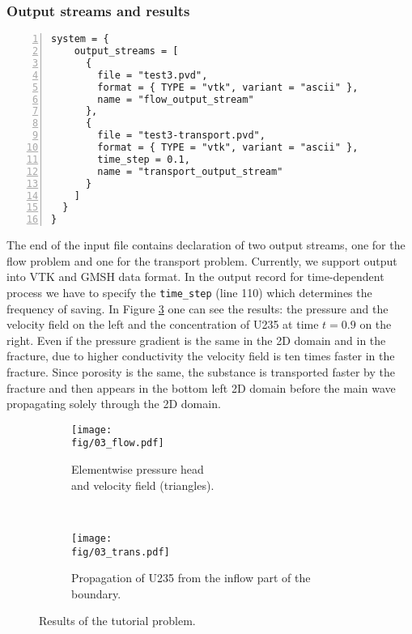 \documentclass[12pt,a4paper]{report}
\def\fig{figures}
\begin{document}
\subsubsection{Output streams and results}
\begin{Verbatim}[numbers=left, firstnumber=last]
  system = {
    output_streams = [
      {
        file = "test3.pvd", 
        format = { TYPE = "vtk", variant = "ascii" },
        name = "flow_output_stream"
      }, 
      {
        file = "test3-transport.pvd", 
        format = { TYPE = "vtk", variant = "ascii" },
        time_step = 0.1,
        name = "transport_output_stream"
      }
    ]
  }
}
\end{Verbatim}
The end of the input file contains declaration of two output streams, one for the flow problem and one for the transport problem. Currently, we support output into VTK and GMSH data format.
In the output record for time-dependent process we have to specify the {\tt time\_step} (line 110) which determines the frequency of saving.
In Figure \ref{fig:tutorial} one can see the results: the pressure and the velocity field on the left and the concentration of U235 at time $t=0.9$ on the right. Even if the pressure gradient is
the same in the 2D domain and in the fracture, due to higher conductivity the velocity field is ten times faster in the fracture. Since porosity is the same, the substance is transported faster by the fracture and
then appears in the bottom left 2D domain before the main wave propagating solely through the 2D domain.



\begin{figure}
    \centering
    \begin{subfigure}[b]{0.45\textwidth}
        \centering
        \texttt{[image: \\fig/03\_flow.pdf]}
        \caption{Elementwise pressure head\\and velocity field (triangles).}
        \label{fig:tut-flow}
    \end{subfigure}
    ~
    \begin{subfigure}[b]{0.45\textwidth}
        \centering
        \texttt{[image: \\fig/03\_trans.pdf]}
        \caption{Propagation of U235 from the inflow part of the boundary.}
        \label{fig:tut-trans}
    \end{subfigure}
    \caption{Results of the tutorial problem.}
    \label{fig:tutorial}
\end{figure}
\end{document}
